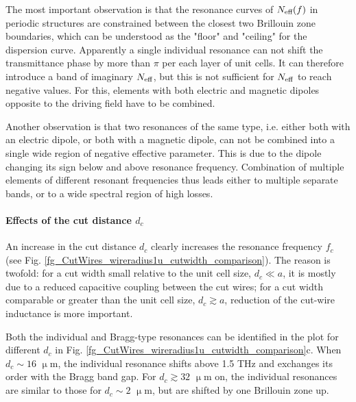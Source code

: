 The most important observation is that the resonance curves of $N_{\text{eff} }(f)$ in periodic structures are constrained between the closest two Brillouin zone boundaries, which can be understood as the "floor" and "ceiling" for the dispersion curve. Apparently a single individual resonance can not shift the transmittance phase by more than $\pi$ per each layer of unit cells. It can therefore introduce a band of imaginary $N_{\text{eff} }$, but this is not sufficient for $N_{\text{eff} }$ to reach negative values. For this, elements with both electric and magnetic dipoles opposite to the driving field have to be combined.

Another observation is that two resonances of the same type, i.e. either both with an electric dipole, or both with a magnetic dipole, can not be combined into a single wide region of negative effective parameter. This is due to the dipole changing its sign below and above resonance frequency. Combination of multiple elements of different resonant frequencies thus leads either to multiple separate bands, or to a wide spectral region of high losses.


\paragraph{Effects of the cut distance $d_c$}%
An increase in the cut distance $d_c$ clearly increases the resonance frequency $f_c$ (see Fig. \ref{fg_CutWires_wireradius1u_cutwidth_comparison}). The reason is twofold: for a cut width small relative to the unit cell size, $d_c\ll a$, it is mostly due to a reduced capacitive coupling between the cut wires; for a cut width comparable or greater than the unit cell size, $d_c \gtrsim a$, reduction of the cut-wire inductance is more important.

Both the individual and Bragg-type resonances can be identified in the plot for different $d_c$ in Fig. \ref{fg_CutWires_wireradius1u_cutwidth_comparison}c. When $d_c \sim 16$  $\upmu$m, the individual resonance shifts above 1.5 THz and exchanges its order with the Bragg band gap. 
For $d_c \gtrsim 32$  $\upmu$m on, the individual resonances are similar to those for $d_c\sim 2$ $\upmu$m, but are shifted by one Brillouin zone up.

